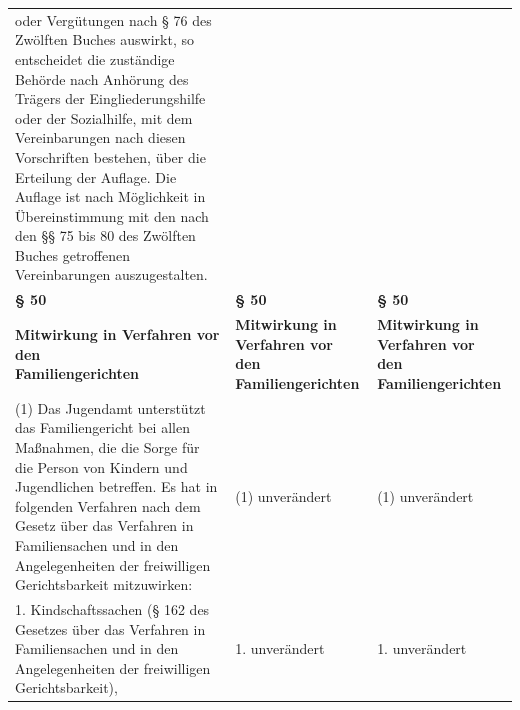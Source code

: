 \documentclass[10pt,a4paper,landscape]{article}
\begin{document}
\begin{longtable}{|L{8.2cm}|L{8.2cm}|L{8.2cm}|}
oder Vergütungen  nach \S{} 76 des  \newline Zwölften Buches auswirkt, so entscheidet  \newline die zuständige Behörde nach Anhörung  \newline des Trägers der Eingliederungshilfe oder  \newline der Sozialhilfe, mit dem Vereinbarungen  \newline nach diesen Vorschriften bestehen, über  \newline die Erteilung der Auflage. Die Auflage ist  \newline nach Möglichkeit in Übereinstimmung mit  \newline den  nach den \S{}\S{} 75 bis 80 des Zwölften  \newline Buches getroffenen Vereinbarungen  \newline auszugestalten. \\
\hhline{|---|}
\textbf{\S{} 50} & \textbf{\S{} 50} & \textbf{\S{} 50} \\
\hhline{|---|}
\textbf{Mitwirkung in Verfahren vor den  \newline Familiengerichten} & \textbf{Mitwirkung in Verfahren vor den  \newline Familiengerichten} & \textbf{Mitwirkung in Verfahren vor den  \newline Familiengerichten} \\
\hhline{|---|}
(1) Das Jugendamt unterstützt das  \newline Familiengericht bei allen Maßnahmen, die  \newline die Sorge für die Person von Kindern und  \newline Jugendlichen betreffen. Es hat in folgenden  \newline Verfahren nach dem Gesetz über das  \newline Verfahren in Familiensachen und in den  \newline Angelegenheiten der freiwilligen  \newline Gerichtsbarkeit mitzuwirken: & (1) unverändert & (1) unverändert \\
\hhline{|---|}
1.  \newline Kindschaftssachen (\S{} 162 des Gesetzes  \newline über das Verfahren in Familiensachen und  \newline in den Angelegenheiten der freiwilligen  \newline Gerichtsbarkeit), & 1. unverändert & 1. unverändert \\

\end{longtable}
\end{document}
